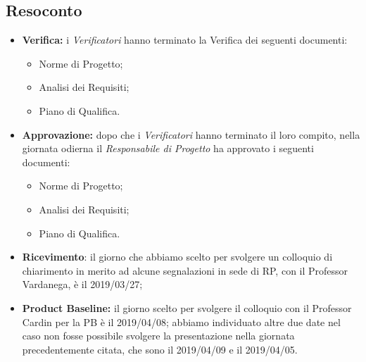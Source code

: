 \subsection{Resoconto}
\begin{itemize}
	\item { \textbf{Verifica:} i \emph{Verificatori} hanno terminato la Verifica dei seguenti documenti:
	\begin{itemize}
		\item Norme di Progetto;
		\item Analisi dei Requisiti;
		\item Piano di Qualifica.
	\end{itemize}}
	\item {\textbf{Approvazione:} dopo che i \emph{Verificatori} hanno terminato il loro compito, nella giornata odierna il \emph{Responsabile di Progetto} ha approvato i seguenti documenti:
		\begin{itemize}
			\item Norme di Progetto;
			\item Analisi dei Requisiti;
			\item Piano di Qualifica.
		\end{itemize}}
	\item {\textbf{Ricevimento}: il giorno che abbiamo scelto per svolgere un colloquio di chiarimento in merito ad alcune segnalazioni in sede di RP, con il Professor Vardanega, è il 2019/03/27;}
	\item { \textbf{Product Baseline:} il giorno scelto per svolgere il colloquio con il Professor Cardin per la PB è il 2019/04/08; abbiamo individuato altre due date nel caso non fosse possibile svolgere la presentazione nella giornata precedentemente citata, che sono il 2019/04/09 e il 2019/04/05.}
\end{itemize}


